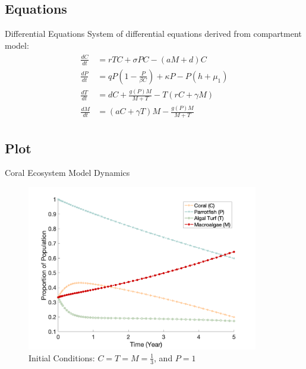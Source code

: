 \documentclass{beamer}
\begin{document}
\subsection{Equations}
\begin{frame}{Differential Equations}
    System of differential equations derived from compartment model:
    \begin{align}
        \begin{split}
            \frac{dC}{dt} &= rTC + \sigma P C- (aM+d)C\\
            \frac{dP}{dt} &= qP \left( 1-\frac{P}{\beta C} \right) + \kappa P - P \left( h+\mu_{1} \right)\\
            \frac{dT}{dt} &= dC + \frac{g(P)M}{M+T} - T(rC+\gamma M)\\
            \frac{dM}{dt} &= (aC+ \gamma T)M - \frac{g(P)M}{M+T}
            \label{SoODE}
        \end{split}
    \end{align}
\end{frame}

\subsection{Plot}
\begin{frame}{Coral Ecosystem Model Dynamics}
    \begin{figure}
        \centering
        \includegraphics[width=0.9\textwidth]{Latex/Figures/initial_matlab_plot.png}
        \caption{Initial Conditions: $C = T = M = \frac{1}{3}$, and $P = 1$}
        \label{fig:my_label}
    \end{figure}
\end{frame}
\end{document}
